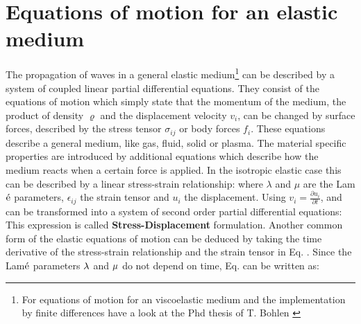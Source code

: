 \documentclass[11pt,onecolumn,oneside]{article}
\begin{document}
\section{Equations of motion for an elastic medium}\label{elastic_fd_model} 
The propagation of waves in a general elastic medium\footnote{For equations of motion for an viscoelastic medium and the implementation by finite differences have a look at the Phd thesis of T. Bohlen \cite{bohlen:98}   } can be described by a system of coupled linear partial differential equations. They consist of the equations of motion
which simply state that the momentum of the medium, the product of density $\varrho$ and the displacement velocity $v_i$, can be changed by surface forces, described by the stress tensor $\sigma_{ij}$ or body forces $f_i$. These equations describe a general medium, like gas, fluid, solid or plasma. The material specific properties are introduced by additional equations which describe how the medium reacts when a certain force is applied. In the isotropic elastic case this can be described by a linear stress-strain relationship:  
where $\lambda$ and $\mu$ are the Lam$\rm{\acute{e}}$ parameters, $\epsilon_{ij}$ the strain tensor and $u_i$ the displacement. Using $v_i = \frac{\partial u_i}{\partial t}$,  and  can be transformed into a system of second order partial differential equations:
This expression is called {\bf{Stress-Displacement}} formulation. Another common form of the elastic equations of motion can be deduced by taking the time derivative of the stress-strain relationship and the strain tensor in Eq. . Since the Lam$\acute{\rm e}$ parameters $\rm{\lambda}$ and $\rm{\mu}$ do not depend on time, Eq.  can be written as:
\end{document}
